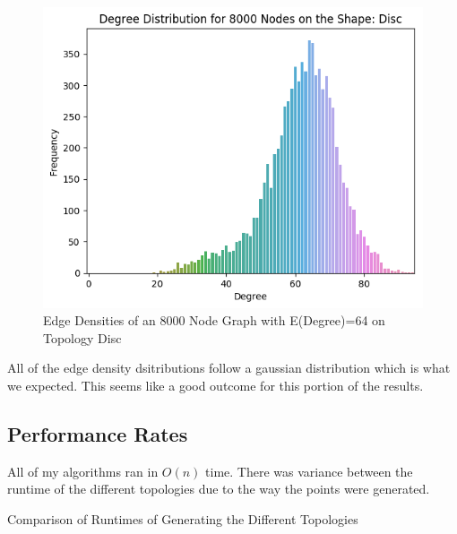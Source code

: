 \documentclass{article}
\begin{document}
  \begin{figure}[H]
    \centering
    \includegraphics[width=1 \textwidth]{disc/edge_density/8000_64.png}
    \caption{Edge Densities of an 8000 Node Graph with E(Degree)=64 on Topology Disc}
  \end{figure}
  All of the edge density dsitributions follow a gaussian distribution which is what we expected.
  This seems like a good outcome for this portion of the results.
  \subsection{Performance Rates}
  All of my algorithms ran in $O(n)$ time.
  There was variance between the runtime of the different topologies due to the way the points were generated.
  \begin{center}
	  \begin{table}[H]
		  \caption{Comparison of Runtimes of Generating the Different Topologies}
	  \end{table}
  \end{center}
\end{document}
